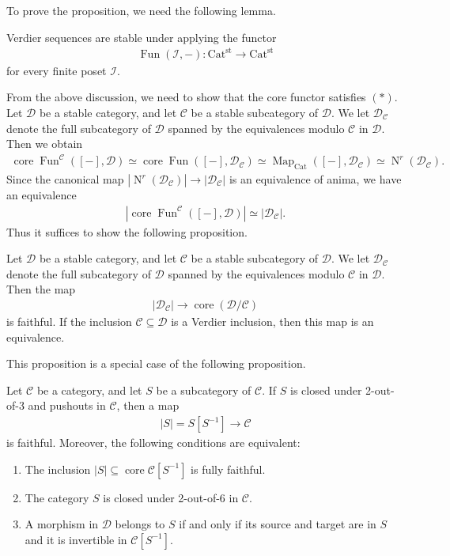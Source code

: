 \documentclass[a4paper,dvipdfmx,11pt,reqno]{amsart}
\DeclareMathOperator{\Map}{Map}
\DeclareMathOperator{\N}{N}
\DeclareMathOperator{\Fun}{Fun}
\DeclareMathOperator{\core}{core}
\newcommand{\C}{\mathcal{C}}
\newcommand{\D}{\mathcal{D}}
\newcommand{\I}{\mathcal{I}}
\newcommand{\Cat}{\mathrm{Cat}}
\newcommand{\Catst}{\mathrm{Cat^{st}}}
\begin{document}
To prove the proposition, we need the following lemma.

\begin{lemma}
  Verdier sequences are stable under applying the functor 
  \begin{align*}
    \Fun(\I,-) : \Catst \to \Catst
  \end{align*}
  for every finite poset $\I$.
\end{lemma}

From the above discussion, we need to show that the core functor satisfies $(\ast)$.
Let $\D$ be a stable category, and let $\C$ be a stable subcategory of $\D$.
We let $\D_{\C}$ denote the full subcategory of $\D$ spanned by the equivalences modulo $\C$ in $\D$.
Then we obtain 
\begin{align*}
  \core\Fun^{\C}([-],\D) 
  \simeq \core\Fun([-],\D_{\C})
  \simeq \Map_{\Cat}([-],\D_{\C})
  \simeq \N^r(\D_{\C}).
\end{align*}
Since the canonical map $|\N^r(\D_{\C})| \to |\D_{\C}|$ is an equivalence of anima, we have an equivalence 
\begin{align*}
  |\core\Fun^{\C}([-],\D)| \simeq |\D_{\C}|.
\end{align*}
Thus it suffices to show the following proposition.

\begin{proposition}
  Let $\D$ be a stable category, and let $\C$ be a stable subcategory of $\D$.
  We let $\D_{\C}$ denote the full subcategory of $\D$ spanned by the equivalences modulo $\C$ in $\D$.
  Then the map 
  \begin{align*}
    |\D_{\C}| \to \core(\D/\C)
  \end{align*}
  is faithful.
  If the inclusion $\C \subseteq \D$ is a Verdier inclusion, then this map is an equivalence.
\end{proposition}

This proposition is a special case of the following proposition.

\begin{proposition}
  Let $\C$ be a category, and let $S$ be a subcategory of $\C$.
  If $S$ is closed under 2-out-of-3 and pushouts in $\C$, then a map 
  \begin{align*}
    |S| = S[S^{-1}] \to \C
  \end{align*}
  is faithful. 
  Moreover, the following conditions are equivalent:
  \begin{enumerate}
    \item The inclusion $|S| \subseteq \core\C[S^{-1}]$ is fully faithful.
    \item The category $S$ is closed under 2-out-of-6 in $\C$.
    \item A morphism in $\D$ belongs to $S$ if and only if its source and target are in $S$ and it is invertible in $\C[S^{-1}]$.
  \end{enumerate}
\end{proposition}
\end{document}
